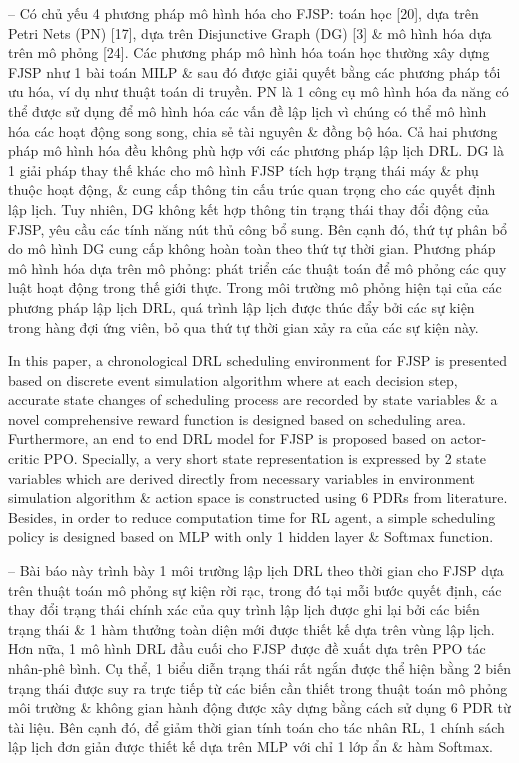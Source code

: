 \documentclass{article}
\begin{document}
\begin{itemize}
    -- Có chủ yếu 4 phương pháp mô hình hóa cho FJSP: toán học [20], dựa trên Petri Nets (PN) [17], dựa trên Disjunctive Graph (DG) [3] \& mô hình hóa dựa trên mô phỏng [24]. Các phương pháp mô hình hóa toán học thường xây dựng FJSP như 1 bài toán MILP \& sau đó được giải quyết bằng các phương pháp tối ưu hóa, ví dụ như thuật toán di truyền. PN là 1 công cụ mô hình hóa đa năng có thể được sử dụng để mô hình hóa các vấn đề lập lịch vì chúng có thể mô hình hóa các hoạt động song song, chia sẻ tài nguyên \& đồng bộ hóa. Cả hai phương pháp mô hình hóa đều không phù hợp với các phương pháp lập lịch DRL. DG là 1 giải pháp thay thế khác cho mô hình FJSP tích hợp trạng thái máy \& phụ thuộc hoạt động, \& cung cấp thông tin cấu trúc quan trọng cho các quyết định lập lịch. Tuy nhiên, DG không kết hợp thông tin trạng thái thay đổi động của FJSP, yêu cầu các tính năng nút thủ công bổ sung. Bên cạnh đó, thứ tự phân bổ do mô hình DG cung cấp không hoàn toàn theo thứ tự thời gian. Phương pháp mô hình hóa dựa trên mô phỏng: phát triển các thuật toán để mô phỏng các quy luật hoạt động trong thế giới thực. Trong môi trường mô phỏng hiện tại của các phương pháp lập lịch DRL, quá trình lập lịch được thúc đẩy bởi các sự kiện trong hàng đợi ứng viên, bỏ qua thứ tự thời gian xảy ra của các sự kiện này.

    In this paper, a chronological DRL scheduling environment for FJSP is presented based on discrete event simulation algorithm where at each decision step, accurate state changes of scheduling process are recorded by state variables \& a novel comprehensive reward function is designed based on scheduling area. Furthermore, an end to end DRL model for FJSP is proposed based on actor-critic PPO. Specially, a very short state representation is expressed by 2 state variables which are derived directly from necessary variables in environment simulation algorithm \& action space is constructed using 6 PDRs from literature. Besides, in order to reduce computation time for RL agent, a simple scheduling policy is designed based on MLP with only 1 hidden layer \& Softmax function.

    -- Bài báo này trình bày 1 môi trường lập lịch DRL theo thời gian cho FJSP dựa trên thuật toán mô phỏng sự kiện rời rạc, trong đó tại mỗi bước quyết định, các thay đổi trạng thái chính xác của quy trình lập lịch được ghi lại bởi các biến trạng thái \& 1 hàm thưởng toàn diện mới được thiết kế dựa trên vùng lập lịch. Hơn nữa, 1 mô hình DRL đầu cuối cho FJSP được đề xuất dựa trên PPO tác nhân-phê bình. Cụ thể, 1 biểu diễn trạng thái rất ngắn được thể hiện bằng 2 biến trạng thái được suy ra trực tiếp từ các biến cần thiết trong thuật toán mô phỏng môi trường \& không gian hành động được xây dựng bằng cách sử dụng 6 PDR từ tài liệu. Bên cạnh đó, để giảm thời gian tính toán cho tác nhân RL, 1 chính sách lập lịch đơn giản được thiết kế dựa trên MLP với chỉ 1 lớp ẩn \& hàm Softmax.


\end{itemize}
\end{document}
